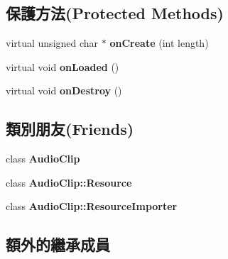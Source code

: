 \subsection*{保護方法(Protected Methods)}
\begin{DoxyCompactItemize}
\item 
virtual unsigned char $\ast$ {\bfseries on\+Create} (int length)\hypertarget{class_i_dream_sky_1_1_audio_clip_1_1_resource_a4ce43457d0a48056a7d055662422acea}{}\label{class_i_dream_sky_1_1_audio_clip_1_1_resource_a4ce43457d0a48056a7d055662422acea}

\item 
virtual void {\bfseries on\+Loaded} ()\hypertarget{class_i_dream_sky_1_1_audio_clip_1_1_resource_ac7f5b3b619d7255683ba37b989e3c28e}{}\label{class_i_dream_sky_1_1_audio_clip_1_1_resource_ac7f5b3b619d7255683ba37b989e3c28e}

\item 
virtual void {\bfseries on\+Destroy} ()\hypertarget{class_i_dream_sky_1_1_audio_clip_1_1_resource_a12404cbfb3c729a73aff132583e7fdab}{}\label{class_i_dream_sky_1_1_audio_clip_1_1_resource_a12404cbfb3c729a73aff132583e7fdab}

\end{DoxyCompactItemize}
\subsection*{類別朋友(Friends)}
\begin{DoxyCompactItemize}
\item 
class {\bfseries Audio\+Clip}\hypertarget{class_i_dream_sky_1_1_audio_clip_1_1_resource_a9d56e3679258061c40e71e5321153525}{}\label{class_i_dream_sky_1_1_audio_clip_1_1_resource_a9d56e3679258061c40e71e5321153525}

\item 
class {\bfseries Audio\+Clip\+::\+Resource}\hypertarget{class_i_dream_sky_1_1_audio_clip_1_1_resource_aad8a33fb5708dac27c0354a31a2e386d}{}\label{class_i_dream_sky_1_1_audio_clip_1_1_resource_aad8a33fb5708dac27c0354a31a2e386d}

\item 
class {\bfseries Audio\+Clip\+::\+Resource\+Importer}\hypertarget{class_i_dream_sky_1_1_audio_clip_1_1_resource_a61e6e8f5b764bb025ab23de0a1f690d5}{}\label{class_i_dream_sky_1_1_audio_clip_1_1_resource_a61e6e8f5b764bb025ab23de0a1f690d5}

\end{DoxyCompactItemize}
\subsection*{額外的繼承成員}


